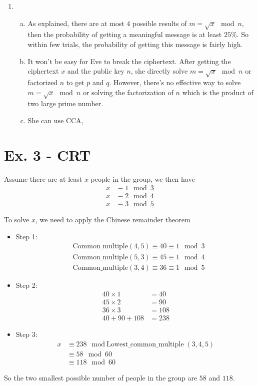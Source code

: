 \documentclass[11pt,a4paper]{article}
\begin{document}
\begin{enumerate}
    \item
    \begin{enumerate}[a)]
        \item As explained, there are at most $4$ possible results of $m = \sqrt{x} \mod n$, then the probability of getting a meaningful message is at least $25\%$. So within few trials, the probability of getting this message is fairly high.

        \item It won't be easy for Eve to break the ciphertext. After getting the ciphertext $x$ and the public key $n$, she directly solve $m = \sqrt{x} \mod n$ or factorized $n$ to get $p$ and $q$. However, there's no effective way to solve $m = \sqrt{x} \mod n$ or solving the factorization of $n$ which is the product of two large prime number.

        \item She can use CCA,
    \end{enumerate}

\end{enumerate}

\section*{Ex. 3 - CRT}
\par Assume there are at least $x$ people in the group, we then have
	\begin{align*}
		x &\equiv 1 \mod 3 \\
		x &\equiv 2 \mod 4 \\
		x &\equiv 3 \mod 5
	\end{align*}
\par To solve $x$, we need to apply the Chinese remainder theorem
	\begin{itemize}
		\item Step 1:
			\begin{align*}
				&\mbox{Common\_multiple}(4, 5) \equiv 40 \equiv 1 \mod 3 \\
				&\mbox{Common\_multiple}(5, 3) \equiv 45 \equiv 1 \mod 4 \\
				&\mbox{Common\_multiple}(3, 4) \equiv 36 \equiv 1 \mod 5
			\end{align*}

		\item Step 2:
			\begin{align*}
				40 \times 1 &= 40 \\
				45 \times 2 &= 90 \\
				36 \times 3 &= 108 \\
				40 + 90 + 108 &= 238
			\end{align*}

		\item Step 3:
			\begin{align*}
				x &\equiv 238 \mod \mbox{Lowest\_common\_multiple} (3, 4 , 5) \\
				&\equiv 58 \mod 60 \\
				&\equiv 118 \mod 60
			\end{align*}
	\end{itemize}
\par So the two smallest possible number of people in the group are $58$ and $118$.
\end{document}
